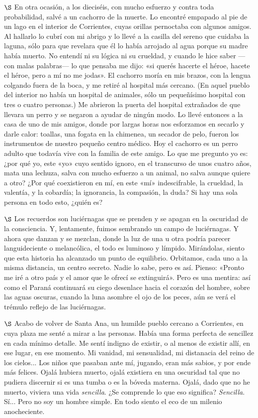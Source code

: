 \documentclass[a4paper, 12pt]{article}
\begin{document}
$\S$ En otra ocasión, a los dieciséis, con mucho esfuerzo y contra toda
probabilidad, salvé a un cachorro de la muerte. Lo encontré empapado al pie de
un lago en el interior de Corrientes, cuyas orillas pernoctaba con algunos
amigos. Al hallarlo lo cubrí con mi abrigo y lo llevé a la casilla del sereno
que cuidaba la laguna, sólo para que revelara que él lo había arrojado al agua
porque su madre había muerto. No entendí ni su lógica ni su crueldad, y cuando
le hice saber ---con malas palabras--- lo que pensaba me dijo: «si querés
hacerte el héroe, hacete el héroe, pero a mí no me jodas». El cachorro moría en
mis brazos, con la lengua colgando fuera de la boca, y me retiré al hospital más
cercano. (En aquel pueblo del interior no había un hospital de animales, sólo un
pequeñísimo hospital con tres o cuatro personas.) Me abrieron la puerta del
hospital extrañados de que llevara un perro y se negaron a ayudar de ningún
modo. Lo llevé entonces a la casa de uno de mis amigos, donde por largas horas
nos esforzamos en secarlo y darle calor: toallas, una fogata en la chimenea, un
secador de pelo, fueron los instrumentos de nuestro pequeño centro médico. Hoy
el cachorro es un perro adulto que todavía vive con la familia de este amigo. Lo
que me pregunto yo es: ¿por qué yo, este «yo» cuyo sentido ignoro, en el
transcurso de unos cuatro años, mata una lechuza, salva con mucho esfuerzo a un
animal, no salva aunque quiere a otro? ¿Por qué coexistieron en mí, en este «mí»
indescifrable, la crueldad, la valentía, y la cobardía; la ignorancia, la
compasión, la duda? Si hay una sola persona en todo esto, ¿quién es?

\newpage 



$\S$ Los recuerdos son luciérnagas que se prenden y se apagan en la oscuridad de
la consciencia. Y, lentamente, fuimos sembrando un campo de luciérnagas. Y ahora
que danzan y se mezclan, donde la luz de una u otra podría parecer
languideciente o melancólica, el todo es luminoso y límpido. Mirándolas, siento
que esta historia ha alcanzado un punto de equilibrio. Orbitamos, cada uno a la
misma distancia, un centro secreto. Nadie lo sabe, pero es así. Pienso: «Pronto
me iré a otro país y el amor que le ofrecí se extinguirá». Pero es una mentira:
así como el Paraná continuará su ciego desenlace hacia el corazón del hombre,
sobre las aguas oscuras, cuando la luna asombre el ojo de los peces, aún se verá
el trémulo reflejo de las luciérnagas.

\newpage 

$\S$ Acabo de volver de Santa Ana, un humilde pueblo cercano a Corrientes, en
cuya plaza me senté a mirar a las personas. Había una forma perfecta de
sencillez en cada mínimo detalle. Me sentí indigno de existir, o al menos de
existir allí, en ese lugar, en ese momento. Mi vanidad, mi sensualidad, mi
distanacia del reino de los cielos... Los niños que pasaban ante mí, jugando,
eran más sabios, y por ende más felices. Ojalá hubiera muerto, ojalá existiera
en una oscuridad tal que no pudiera discernir si es una tumba o es la bóveda
materna. Ojalá, dado que no he muerto, viviera una vida \textit{sencilla}. ¿Se
comprende lo que eso significa? \textit{Sencilla}. Sí... Pero no soy un hombre
simple. En todo siento el eco de un milenio anocheciente.
\end{document}
